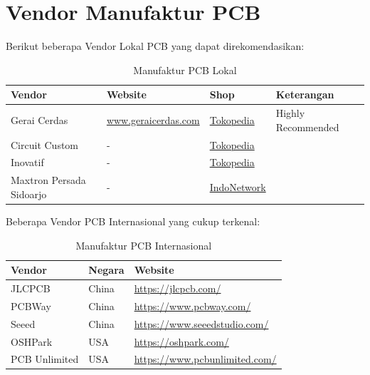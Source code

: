 \documentclass[12pt]{book}
\begin{document}
	\section{Vendor Manufaktur PCB}

	Berikut beberapa Vendor Lokal PCB yang dapat direkomendasikan:

	\begin{table}[h!]
		\begin{center}
			\begin{tabular}{|l|l|l|l|}
				\toprule
				Vendor & Website & Shop & Keterangan \\
				\midrule
				Gerai Cerdas & \url{www.geraicerdas.com} & \href{https://www.tokopedia.com/geraicerdas/cetak-pcb-1-keping-single-double-layer-rapid-prototyping-satuan}{Tokopedia} & Highly Recommended \\
				\midrule
				Circuit Custom & - & \href{https://www.tokopedia.com/circuit-custom/cetak-pcb-1-2-layer-rf4-hasl-green-solder-mask-slikscreen-putih-low-cost-100}{Tokopedia} & \\
				\midrule
				Inovatif & - & \href{https://www.tokopedia.com/inovatif/cetak-pcb-satuan-dan-desain-pcb-masking}{Tokopedia} & \\
				\midrule
				Maxtron Persada Sidoarjo & - & \href{https://cvmpi.indonetwork.co.id/info}{IndoNetwork} & \\
				\bottomrule
			\end{tabular}
			\caption{Manufaktur PCB Lokal}
		\end{center}
	\end{table}

	Beberapa Vendor PCB Internasional yang cukup terkenal:

	\begin{table}[h!]
		\begin{center}
			\begin{tabular}{|l|l|l|}
				\toprule
				Vendor &  Negara & Website \\
				\midrule
				JLCPCB & China & \url{https://jlcpcb.com/} \\
				\midrule
				PCBWay & China & \url{https://www.pcbway.com/} \\
				\midrule
				Seeed & China & \url{https://www.seeedstudio.com/} \\
				\midrule
				OSHPark & USA & \url{https://oshpark.com/} \\
				\midrule
				PCB Unlimited & USA & \url{https://www.pcbunlimited.com/} \\
				\bottomrule
			\end{tabular}
			\caption{Manufaktur PCB Internasional}
		\end{center}
	\end{table}
\end{document}
